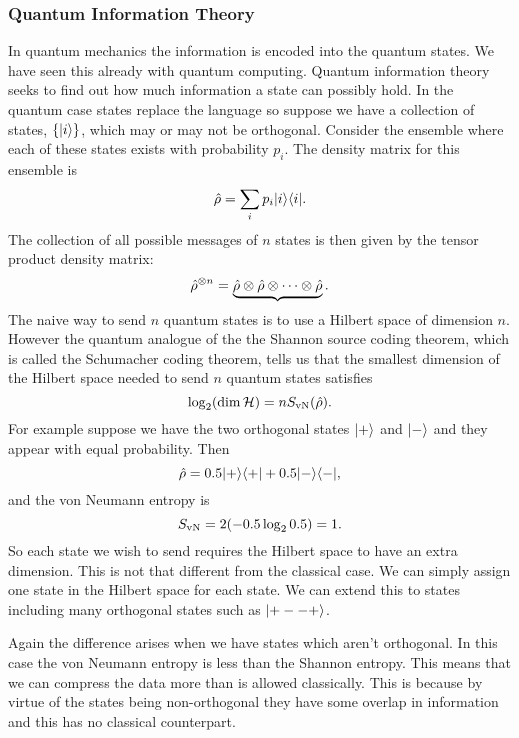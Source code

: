     \subsubsection{Quantum Information Theory}
    In quantum mechanics the information is encoded into the quantum states.
    We have seen this already with quantum computing.
    Quantum information theory seeks to find out how much information a state can possibly hold.
    In the quantum case states replace the language so suppose we have a collection of states, \(\{\vert {i} \rangle\}\), which may or may not be orthogonal.
    Consider the ensemble where each of these states exists with probability \(p_i\).
    The density matrix for this ensemble is
    \[\hat{\rho} = \sum_i p_i \vert {i}\rangle\langle {i} \vert.\]
    The collection of all possible messages of \(n\) states is then given by the tensor product density matrix:
    \[\hat{\rho}^{\otimes n} = \underbrace{\hat{\rho} \otimes\hat{\rho} \otimes \dotsm \otimes \hat{\rho}}.\]
    The naive way to send \(n\) quantum states is to use a Hilbert space of dimension \(n\).
    However the quantum analogue of the the Shannon source coding theorem, which is called the Schumacher coding theorem, tells us that the smallest dimension of the Hilbert space needed to send \(n\) quantum states satisfies
    \[\log_2(\dim\mathcal{H}) = nS_{\mathrm{vN}}(\hat{\rho}).\]
    For example suppose we have the two orthogonal states \(\vert {+} \rangle\) and \(\vert {-} \rangle\) and they appear with equal probability.
    Then
    \[\hat{\rho} = 0.5\vert {+}\rangle\langle {+} \vert + 0.5\vert {-}\rangle\langle {-} \vert,\]
    and the von Neumann entropy is
    \[S_{\mathrm{vN}} = 2(-0.5\log_20.5) = 1.\]
    So each state we wish to send requires the Hilbert space to have an extra dimension.
    This is not that different from the classical case.
    We can simply assign one state in the Hilbert space for each state.
    We can extend this to states including many orthogonal states such as \(\vert {+--+} \rangle\).
    
    Again the difference arises when we have states which aren't orthogonal.
    In this case the von Neumann entropy is less than the Shannon entropy.
    This means that we can compress the data more than is allowed classically.
    This is because by virtue of the states being non-orthogonal they have some overlap in information and this has no classical counterpart.
    
